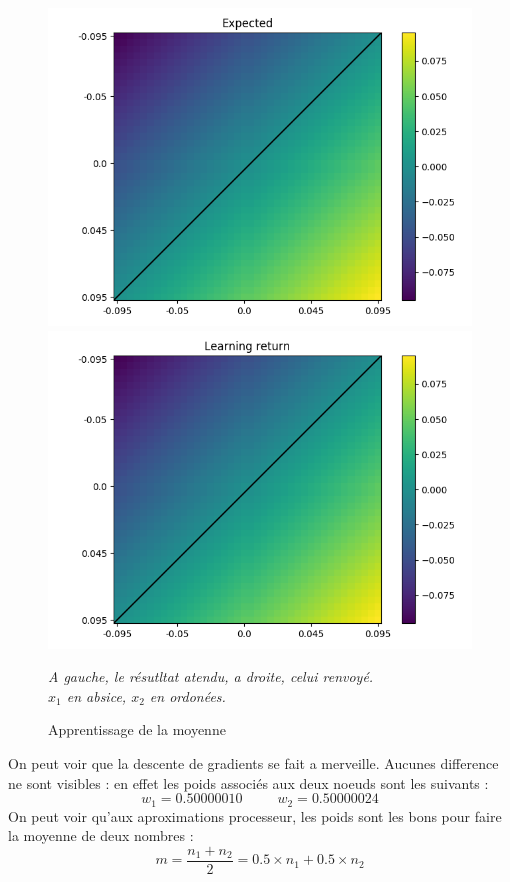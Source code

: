 \begin{figure}[H]
    \center
    \includegraphics[height=\petit]{pict/moy/expected}
    \includegraphics[height=\petit]{pict/moy/result}
	\caption{Apprentissage de la moyenne}
    \begin{center}
        \textit{
        A gauche, le résutltat atendu, a droite, celui renvoyé.\\
        $x_1$ en absice, $x_2$ en ordonées.
        }
    \end{center}
	\label{fig:moy}
\end{figure}
\vspace{-12pt}

On peut voir que la descente de gradients se fait a merveille.
Aucunes difference ne sont visibles : en effet les poids associés aux deux noeuds sont les suivants :
\begin{equation*}
    w_1 = 0.50000010
    \;\;\;\;\;\;\;\;\;
    w_2 = 0.50000024
\end{equation*}
On peut voir qu'aux aproximations processeur, les poids sont les bons pour faire la moyenne de deux nombres :
\begin{equation*}
    m =\frac{n_1 + n_2}{2} = 0.5 \times n_1 + 0.5 \times n_2
\end{equation*}


